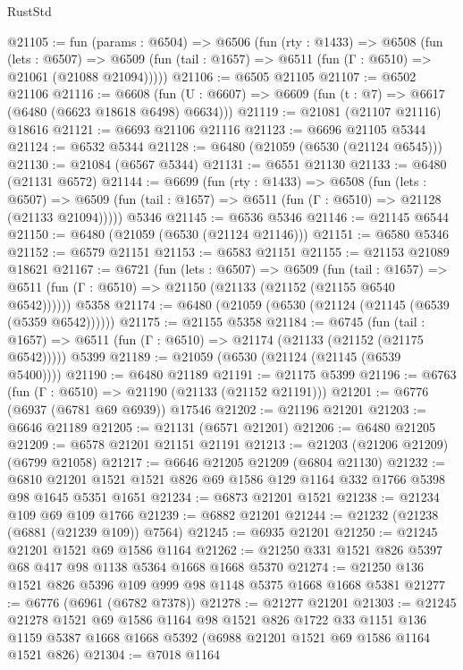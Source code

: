 \begin{lexlean}{RustStd}
\begin{coremodule}
@21105 := fun (params : @6504) =>
  @6506
    (fun (rty : @1433) =>
    @6508
      (fun (lets : @6507) =>
      @6509 (fun (tail : @1657) => @6511 (fun (Γ : @6510) => @21061 (@21088 @21094)))))
@21106 := @6505 @21105
@21107 := @6502 @21106
@21116 := @6608
    (fun (U : @6607) => @6609 (fun (t : @7) => @6617 (@6480 (@6623 @18618 @6498) @6634)))
@21119 := @21081 (@21107 @21116) @18616
@21121 := @6693 @21106 @21116
@21123 := @6696 @21105 @5344
@21124 := @6532 @5344
@21128 := @6480 (@21059 (@6530 (@21124 @6545)))
@21130 := @21084 (@6567 @5344)
@21131 := @6551 @21130
@21133 := @6480 (@21131 @6572)
@21144 := @6699
    (fun (rty : @1433) =>
    @6508
      (fun (lets : @6507) =>
      @6509 (fun (tail : @1657) => @6511 (fun (Γ : @6510) => @21128 (@21133 @21094)))))
    @5346
@21145 := @6536 @5346
@21146 := @21145 @6544
@21150 := @6480 (@21059 (@6530 (@21124 @21146)))
@21151 := @6580 @5346
@21152 := @6579 @21151
@21153 := @6583 @21151
@21155 := @21153 @21089 @18621
@21167 := @6721
    (fun (lets : @6507) =>
    @6509
      (fun (tail : @1657) =>
      @6511 (fun (Γ : @6510) => @21150 (@21133 (@21152 (@21155 @6540 @6542))))))
    @5358
@21174 := @6480 (@21059 (@6530 (@21124 (@21145 (@6539 (@5359 @6542))))))
@21175 := @21155 @5358
@21184 := @6745
    (fun (tail : @1657) => @6511 (fun (Γ : @6510) => @21174 (@21133 (@21152 (@21175 @6542)))))
    @5399
@21189 := @21059 (@6530 (@21124 (@21145 (@6539 @5400))))
@21190 := @6480 @21189
@21191 := @21175 @5399
@21196 := @6763 (fun (Γ : @6510) => @21190 (@21133 (@21152 @21191)))
@21201 := @6776 (@6937 (@6781 @69 @6939)) @17546
@21202 := @21196 @21201
@21203 := @6646 @21189
@21205 := @21131 (@6571 @21201)
@21206 := @6480 @21205
@21209 := @6578 @21201 @21151 @21191
@21213 := @21203 (@21206 @21209) (@6799 @21058)
@21217 := @6646 @21205 @21209 (@6804 @21130)
@21232 := @6810 @21201 @1521 @1521 @826 @69 @1586 @129 @1164 @332 @1766 @5398 @98 @1645 @5351 @1651
@21234 := @6873 @21201 @1521
@21238 := @21234 @109 @69 @109 @1766
@21239 := @6882 @21201
@21244 := @21232 (@21238 (@6881 (@21239 @109)) @7564)
@21245 := @6935 @21201
@21250 := @21245 @21201 @1521 @69 @1586 @1164
@21262 := @21250 @331 @1521 @826 @5397 @68 @417 @98 @1138 @5364 @1668 @1668 @5370
@21274 := @21250 @136 @1521 @826 @5396 @109 @999 @98 @1148 @5375 @1668 @1668 @5381
@21277 := @6776 (@6961 (@6782 @7378))
@21278 := @21277 @21201
@21303 := @21245
    @21278
    @1521
    @69
    @1586
    @1164
    @98
    @1521
    @826
    @1722
    @33
    @1151
    @136
    @1159
    @5387
    @1668
    @1668
    @5392
    (@6988 @21201 @1521 @69 @1586 @1164 @1521 @826)
@21304 := @7018 @1164

\end{coremodule}
\end{lexlean}
